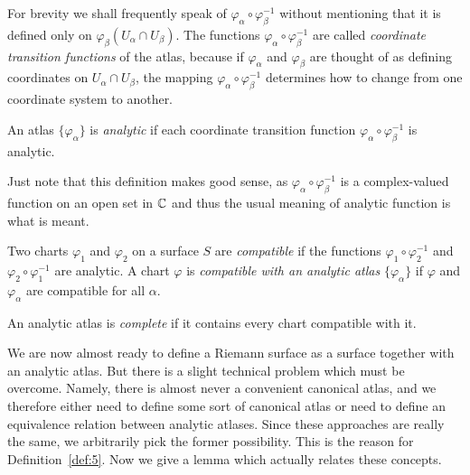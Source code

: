 \documentclass[a4paper,11pt]{article}
\begin{document}
\begin{mdframed}
  \vspace{4cm}
\end{mdframed}

For brevity we shall frequently speak of $\varphi_\alpha \circ
\varphi_\beta^{-1}$ without mentioning that it is defined only on
$\varphi_\beta(U_\alpha \cap U_\beta)$.  The functions $\varphi_\alpha
\circ \varphi_\beta^{-1}$ are called \emph{coordinate transition
  functions} of the atlas, because if $\varphi_\alpha$ and
$\varphi_\beta$ are thought of as defining coordinates on $U_\alpha
\cap U_\beta$, the mapping $\varphi_\alpha \circ \varphi_\beta^{-1}$
determines how to change from one coordinate system to another.

\begin{defn}
  An atlas $\{\varphi_\alpha\}$ is \emph{analytic} if each coordinate
  transition function $\varphi_\alpha \circ \varphi_\beta^{-1}$ is
  analytic.
\end{defn}

Just note that this definition makes good sense, as $\varphi_\alpha
\circ \varphi_\beta^{-1}$ is a complex-valued function on an open set
in ${\mathbb C}$ and thus the usual meaning of analytic function is what is
meant.

\begin{defn}
  Two charts $\varphi_1$ and $\varphi_2$ on a surface $S$ are
  \emph{compatible} if the functions $\varphi_1 \circ \varphi_2^{-1}$
  and $\varphi_2\circ \varphi_1^{-1}$ are analytic.  A chart $\varphi$
  is \emph{compatible with an analytic atlas} $\{\varphi_\alpha\}$ if
  $\varphi$ and $\varphi_\alpha$ are compatible for all $\alpha$.
\end{defn}

\begin{defn}
  \label{def:5}
  An analytic atlas is \emph{complete} if it contains every chart
  compatible with it.
\end{defn}

We are now almost ready to define a Riemann surface as a surface
together with an analytic atlas.  But there is a slight technical
problem which must be overcome.  Namely, there is almost never a
convenient canonical atlas, and we therefore either need to define
some sort of canonical atlas or need to define an equivalence relation
between analytic atlases.  Since these approaches are really the same,
we arbitrarily pick the former possibility.  This is the reason for
Definition~\ref{def:5}.  Now we give a lemma which actually relates
these concepts.
\end{document}
